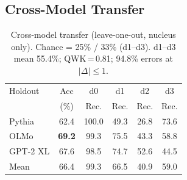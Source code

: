 \begin{table}[t]
\centering
\small
\caption{Method comparison (RF mean across 9 cells, 5-fold CV). Chance = 25\% / 33.3\% (d1--d3). $^\dagger$Adapted from binary detection; Binoculars 11-feat: $p{>}0.05$ vs.\ 19-feat RF (paired permutation test).}
\label{tab:baselines}
\end{table}

\subsection{Cross-Model Transfer}
\label{sec:gen:crossmodel}

\begin{table}[t]
\centering
\small
\caption{Cross-model transfer (leave-one-out, nucleus only). Chance = 25\% / 33\% (d1--d3). d1--d3 mean 55.4\%; QWK\,=\,0.81; 94.8\% errors at $|\Delta| \leq 1$.}
\label{tab:cross_model}
\begin{tabular}{lccccc}
\toprule
Holdout & Acc & d0 & d1 & d2 & d3 \\
 & (\%) & Rec. & Rec. & Rec. & Rec. \\
\midrule
Pythia & 62.4 & 100.0 & 49.3 & 26.8 & 73.6 \\
OLMo & \textbf{69.2} & 99.3 & 75.5 & 43.3 & 58.8 \\
GPT-2 XL & 67.6 & 98.5 & 74.7 & 52.6 & 44.5 \\
\midrule
Mean & 66.4 & 99.3 & 66.5 & 40.9 & 59.0 \\
\bottomrule
\end{tabular}
\end{table}

